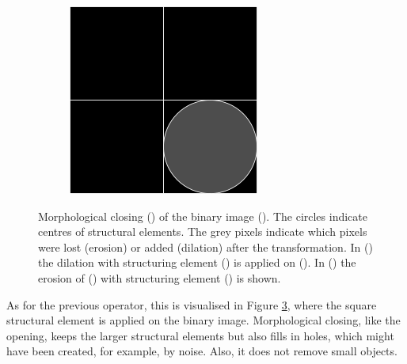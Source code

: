 \documentclass[
  digital,     %
  oneside,     %
  nosansbold,  %
  nocolorbold, %
  lof,         %
  lot,         %
]{fithesis4}
\begin{document}
\begin{figure}
\begin{subfigure}[t]{0.4\textwidth}
        \caption{}
        \label{fig:closing_erosion}
    \end{subfigure}
    \begin{subfigure}[t]{0.2\textwidth}
        \centering
        \includegraphics[width=\textwidth]{resources/inkscape/opening_dilation_se.png}
        \caption{}
        \label{fig:closing_dilation_se}
    \end{subfigure}
    \caption{Morphological closing () of the binary image (). The circles indicate centres of structural elements. The grey pixels indicate which pixels were lost (erosion) or added (dilation) after the transformation. In () the dilation with structuring element () is applied on (). In () the erosion of () with structuring element () is shown.}
    \label{fig:closing}
\end{figure}

As for the previous operator, this is visualised in Figure \ref{fig:closing},
where the square structural element is applied on the binary image.
Morphological closing, like the opening, keeps the larger structural elements
but also fills in holes, which might have been created, for example, by noise.
Also, it does not remove small objects.
\end{document}
